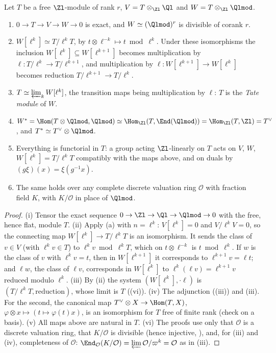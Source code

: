 \begin{proposition}\label{prop:modules:t-and-w}
Let $T$ be a free $\Zl$-module of rank $r$, $V=T\otimes_{\Zl}\Ql$ and $W=T\otimes_{\Zl}\Qlmod$.
\begin{enumerate}[label=(\roman*)]
\item $0\to T\to V\to W\to0$ is exact, and $W\simeq(\Qlmod)^r$ is divisible of corank $r$.
\item $W[\ell^k]\simeq T/\ell^kT$, by $t\otimes\ell^{-k}\mapsto t\bmod\ell^k$. Under these isomorphisms the inclusion $W[\ell^k]\subseteq W[\ell^{k+1}]$ becomes multiplication by
$\ell\colon T/\ell^k\to T/\ell^{k+1}$, and multiplication by $\ell\colon W[\ell^{k+1}]\to W[\ell^k]$ becomes reduction $T/\ell^{k+1}\to T/\ell^k$.
\item $T\simeq\varprojlim_kW[\ell^k]$, the transition maps being multiplication by $\ell$: $T$ is the \emph{Tate module} of $W$.
\item $W^*=\Hom(T\otimes\Qlmod,\Qlmod)\simeq\Hom_{\Zl}(T,\End(\Qlmod))=\Hom_{\Zl}(T,\Zl)=T^\vee$, and $T^*\simeq T^\vee\otimes\Qlmod$.
\item Everything is functorial in $T$: a group acting $\Zl$-linearly on $T$ acts on $V$, $W$, $W[\ell^k]=T/\ell^kT$ compatibly with the maps above, and on
duals by $(g\xi)(x)=\xi(g^{-1}x)$.
\item The same holds over any complete discrete valuation ring $\mathcal O$ with fraction field $K$, with $K/\mathcal O$ in place of $\Qlmod$.
\end{enumerate}
\end{proposition}

\begin{proof}
(i) Tensor the exact sequence $0\to\Zl\to\Ql\to\Qlmod\to0$ with the free, hence flat, module $T$. (ii) Apply (a) with $n=\ell^k$:
$V[\ell^k]=0$ and $V/\ell^kV=0$, so the connecting map $W[\ell^k]\to T/\ell^kT$ is an isomorphism. It sends the class of $v\in V$ (with $\ell^kv\in T$) to
$\ell^kv\bmod\ell^kT$, which on $t\otimes\ell^{-k}$ is $t\bmod\ell^k$. If $w$ is the class of $v$ with $\ell^kv=t$, then in $W[\ell^{k+1}]$ it corresponds to
$\ell^{k+1}v=\ell t$; and $\ell w$, the class of $\ell v$, corresponds in $W[\ell^k]$ to $\ell^k(\ell v)=\ell^{k+1}v$ reduced modulo $\ell^k$.
(iii) By (ii) the system $(W[\ell^k],\cdot\ell)$ is $(T/\ell^kT,\text{reduction})$, whose limit is $T$ ((vi)).
(iv) The adjunction ((iii)) and (iii). For the second, the canonical map
$T^\vee\otimes X\to\Hom(T,X)$, $\varphi\otimes x\mapsto(t\mapsto\varphi(t)x)$, is an isomorphism for $T$ free of finite rank (check on a basis).
(v) All maps above are natural in $T$. (vi) The proofs use only that $\mathcal O$ is a discrete valuation ring, that $K/\mathcal O$ is divisible (hence injective,
), and, for (iii) and (iv), completeness of $\mathcal O$: $\End_{\mathcal O}(K/\mathcal O)=\varprojlim\mathcal O/\varpi^k=\mathcal O$ as in
(iii).
\end{proof}

